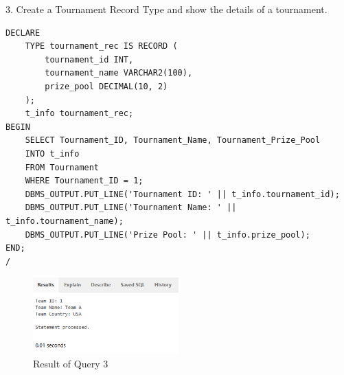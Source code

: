 3. Create a Tournament Record Type and show the details of a tournament.

\begin{lstlisting}[caption={ Query 3},label={lst:q-3}]
    DECLARE
    TYPE tournament_rec IS RECORD (
        tournament_id INT,
        tournament_name VARCHAR2(100),
        prize_pool DECIMAL(10, 2)
    );
    t_info tournament_rec;
BEGIN
    SELECT Tournament_ID, Tournament_Name, Tournament_Prize_Pool
    INTO t_info
    FROM Tournament
    WHERE Tournament_ID = 1;
    DBMS_OUTPUT.PUT_LINE('Tournament ID: ' || t_info.tournament_id);
    DBMS_OUTPUT.PUT_LINE('Tournament Name: ' || t_info.tournament_name);
    DBMS_OUTPUT.PUT_LINE('Prize Pool: ' || t_info.prize_pool);
END;
/
\end{lstlisting}

\begin{figure}[H]
    \centering
    \includegraphics[width=0.5\textwidth]{images/plsql/record/Team Record Type.png}
    \caption{Result of Query 3}
\end{figure}